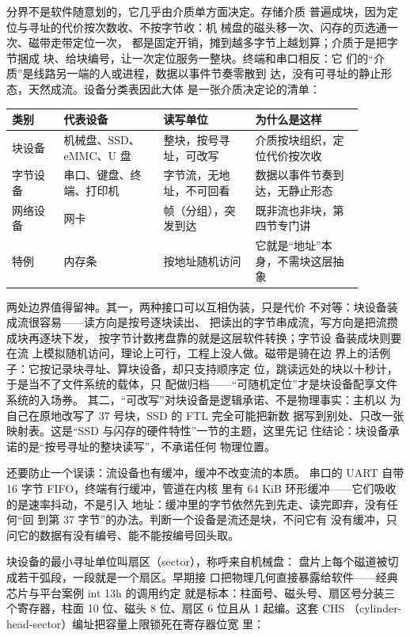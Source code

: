 分界不是软件随意划的，它几乎由介质单方面决定。存储介质
普遍成块，因为定位与寻址的代价按次数收、不按字节收：机
械盘的磁头移一次、闪存的页选通一次、磁带走带定位一次，
都是固定开销，摊到越多字节上越划算；介质于是把字节捆成
块、给块编号，让一次定位服务一整块。终端和串口相反：它
们的“介质”是线路另一端的人或进程，数据以事件节奏零散到
达，没有可寻址的静止形态，天然成流。设备分类表因此大体
是一张介质决定论的清单：

\begin{longtable}{L{0.13\linewidth}L{0.25\linewidth}L{0.23\linewidth}L{0.27\linewidth}}
\toprule
类别 & 代表设备 & 读写单位 & 为什么是这样 \\
\midrule
块设备 & 机械盘、SSD、eMMC、U 盘 & 整块，按号寻址，可改写 & 介质按块组织，定位代价按次收 \\\tablerowrule
字节设备 & 串口、键盘、终端、打印机 & 字节流，无地址，不可回看 & 数据以事件节奏到达，无静止形态 \\\tablerowrule
网络设备 & 网卡 & 帧（分组），突发到达 & 既非流也非块，第四节专门讲 \\\tablerowrule
特例 & 内存条 & 按地址随机访问 & 它就是“地址”本身，不需块这层抽象 \\
\bottomrule
\end{longtable}

两处边界值得留神。其一，两种接口可以互相伪装，只是代价
不对等：块设备装成流很容易——读方向是按号逐块读出、
把读出的字节串成流，写方向是把流攒成块再逐块下发，
 按字节计数拷盘靠的就是这层软件转换；字节设
备装成块则要在流
上模拟随机访问，理论上可行，工程上没人做。磁带是骑在边
界上的活例子：它按记录块寻址、算块设备，却只支持顺序定
位，跳读远处的块以十秒计，于是当不了文件系统的载体，只
配做归档——“可随机定位”才是块设备配享文件系统的入场券。
其二，“可改写”对块设备是逻辑承诺、不是物理事实：主机以
为自己在原地改写了 37 号块，SSD 的 FTL 完全可能把新数
据写到别处、只改一张映射表。这是“SSD 与闪存的硬件特性”一节的主题，这里先记
住结论：块设备承诺的是“按号寻址的整块读写”，不承诺任何
物理位置。

还要防止一个误读：流设备也有缓冲，缓冲不改变流的本质。
串口的 UART 自带 16 字节 FIFO，终端有行缓冲，管道在内核
里有 64 KiB 环形缓冲——它们吸收的是速率抖动，不是引入
地址：缓冲里的字节依然先到先走、读完即弃，没有任何“回
到第 37 字节”的办法。判断一个设备是流还是块，不问它有
没有缓冲，只问它的数据有没有编号、能不能按编号回头取。

块设备的最小寻址单位叫扇区（sector），称呼来自机械盘：
盘片上每个磁道被切成若干弧段，一段就是一个扇区。早期接
口把物理几何直接暴露给软件——经典芯片与平台案例 int 13h 的调用约定
就是标本：柱面号、磁头号、扇区号分装三个寄存器，柱面
10 位、磁头 8 位、扇区 6 位且从 1 起编。这套 CHS
（cylinder-head-sector）编址把容量上限锁死在寄存器位宽
里：

